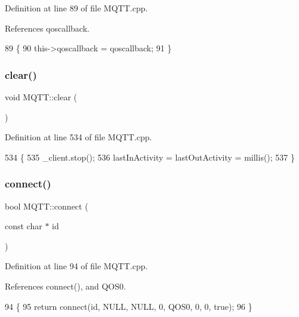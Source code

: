 Definition at line 89 of file M\+Q\+T\+T.\+cpp.



References qoscallback.


\begin{DoxyCode}
89                                                            \{
90     this->qoscallback = qoscallback;
91 \}
\end{DoxyCode}
\mbox{\label{class_m_q_t_t_a510932d1c5fb0c918debcf60cfc267e1}} 
\subsubsection{clear()}
{\footnotesize\ttfamily void M\+Q\+T\+T\+::clear (\begin{DoxyParamCaption}{ }\end{DoxyParamCaption})}



Definition at line 534 of file M\+Q\+T\+T.\+cpp.


\begin{DoxyCode}
534                  \{
535   _client.stop();
536   lastInActivity = lastOutActivity = millis();
537 \}
\end{DoxyCode}
\mbox{\label{class_m_q_t_t_ae76d538b01191df33610a950bf4e9717}} 
\subsubsection{connect()\hspace{0.1cm}{\footnotesize\ttfamily [1/3]}}
{\footnotesize\ttfamily bool M\+Q\+T\+T\+::connect (\begin{DoxyParamCaption}\item[{const char $\ast$}]{id }\end{DoxyParamCaption})}



Definition at line 94 of file M\+Q\+T\+T.\+cpp.



References connect(), and Q\+O\+S0.


\begin{DoxyCode}
94                                  \{
95     \textcolor{keywordflow}{return} connect(\textcolor{keywordtype}{id}, NULL, NULL, 0, QOS0, 0, 0, \textcolor{keyword}{true});
96 \}
\end{DoxyCode}
\mbox{\label{class_m_q_t_t_a280e592fced51964607c66f7ab450b46}} 
